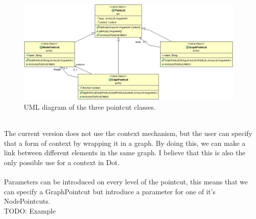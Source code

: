 \documentclass[a4paper]{report}
\begin{document}
\begin{figure}
\centering
\includegraphics[scale=0.3]{images/AOFDot/DotPointcuts.jpg}
\caption{UML diagram of the three pointcut classes.}
\label{fig:DotPointcuts}
\end{figure}
\\
The current version does not use the context mechanism, but the user can specify that a form of context by wrapping it in a graph. By doing this, we can make a link between different elements in the same graph. I believe that this is also the only possible use for a context in Dot.\\
\\
Parameters can be introduced on every level of the pointcut, this means that we can specify a GraphPointcut but introduce a parameter for one of it's NodePointcuts.\\
TODO: Example
\end{document}
